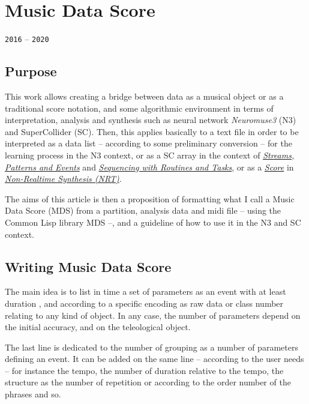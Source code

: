 \chapter{Music Data Score}
\thispagestyle{empty}

\label{mds}
{\texttt{2016} -- \texttt{2020}}

\bigskip
\smallskip

\section{Purpose}
\label{purp}

This work allows creating a bridge between data as a musical object or as a traditional score notation, and some algorithmic environment in terms of interpretation, analysis and synthesis such as neural network \textsl{Neuromuse3} (N3) and SuperCollider (SC). Then, this applies basically to a text file in order to be interpreted as a data list -- according to some preliminary conversion -- for the learning process in the N3 context, 
or as a SC array in the context of \href{http://doc.sccode.org/Tutorials/Streams-Patterns-Events1.html}{\textit{Streams, Patterns and Events}} and \href{http://doc.sccode.org/Tutorials/Getting-Started/15-Sequencing-with-Routines-and-Tasks.html}{\textit{Sequencing with Routines and Tasks}}, or as a \href{http://doc.sccode.org/Classes/Score.html}{\textit{Score}} in \href{http://doc.sccode.org/Guides/Non-Realtime-Synthesis.html}{\textit{Non-Realtime Synthesis (NRT)}}.

The aims of this article is then a proposition of formatting what I call a Music Data Score (MDS) from a partition, analysis data and midi file -- using the Common Lisp library MDS --, and a guideline of how to use it in the N3 and SC context.

\section{Writing Music Data Score}

The main idea is to list in time a set of parameters as an event with at least duration , and according to a specific encoding as raw data or class number relating to any kind of object. In any case, the number of parameters depend on the initial accuracy, and on the teleological object.

The last line is dedicated to the number of grouping as a number of parameters defining an event. It can be added on the same line -- according to the user needs -- for instance the tempo, the number of duration relative to the tempo, the structure as the number of repetition or according to the order number of the phrases and so.


